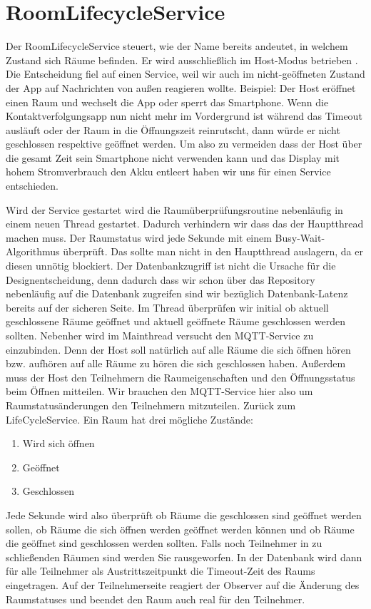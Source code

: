 \section{RoomLifecycleService}
\label{sec:RoomLifecycleService}
Der RoomLifecycleService steuert, wie der Name bereits andeutet, in welchem Zustand sich Räume befinden. Er wird ausschließlich im Host-Modus betrieben .
Die Entscheidung fiel auf einen Service, weil wir auch im nicht-geöffneten Zustand der App auf Nachrichten von außen reagieren wollte. 
Beispiel: Der Host eröffnet einen Raum und wechselt die App oder sperrt das Smartphone. Wenn die Kontaktverfolgungsapp nun nicht mehr im Vordergrund ist während das Timeout ausläuft oder der Raum in die Öffnungszeit reinrutscht, dann würde er nicht geschlossen respektive geöffnet werden. Um also zu vermeiden dass der Host über die gesamt Zeit sein Smartphone nicht verwenden kann und das Display mit hohem Stromverbrauch den Akku entleert haben wir uns für einen Service entschieden. 

Wird der Service gestartet wird die Raumüberprüfungsroutine nebenläufig in einem neuen Thread gestartet. Dadurch verhindern wir dass das der Hauptthread machen muss. Der Raumstatus wird jede Sekunde mit einem Busy-Wait-Algorithmus überprüft. Das sollte man nicht in den Hauptthread auslagern, da er diesen unnötig blockiert. Der Datenbankzugriff ist nicht die Ursache für die Designentscheidung, denn dadurch dass wir schon über das Repository nebenläufig auf die Datenbank zugreifen sind wir bezüglich Datenbank-Latenz bereits auf der sicheren Seite.
Im Thread überprüfen wir initial ob aktuell geschlossene Räume geöffnet und aktuell geöffnete Räume geschlossen werden sollten.
 Nebenher wird im Mainthread versucht den MQTT-Service zu einzubinden. Denn der Host soll natürlich auf alle Räume die sich öffnen hören bzw. aufhören auf alle Räume zu hören die sich geschlossen haben. 
Außerdem muss der Host den Teilnehmern die Raumeigenschaften und den Öffnungsstatus beim Öffnen mitteilen. Wir brauchen den MQTT-Service hier also um Raumstatusänderungen den Teilnehmern mitzuteilen.
Zurück zum LifeCycleService.
Ein Raum hat drei mögliche Zustände:
\begin{enumerate}
\item Wird sich öffnen
\item Geöffnet
\item Geschlossen
\end{enumerate}
 Jede Sekunde wird also überprüft ob Räume die geschlossen sind geöffnet werden sollen, ob Räume die sich öffnen werden geöffnet werden können und ob Räume die geöffnet sind geschlossen werden sollten. 
Falls noch Teilnehmer in zu schließenden Räumen sind werden Sie rausgeworfen. In der Datenbank wird dann für alle Teilnehmer als Austrittszeitpunkt die Timeout-Zeit des Raums eingetragen. 
Auf der Teilnehmerseite reagiert der Observer auf die Änderung des Raumstatuses und beendet den Raum auch real für den Teilnehmer.

